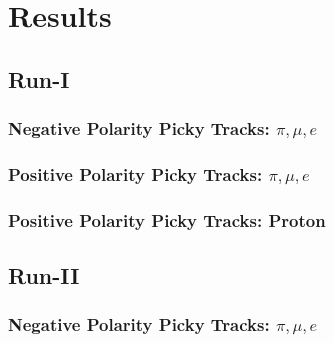 \section{Results}\label{sec:Results}


\subsection{Run-I}\label{sec:RunI}




\subsubsection{Negative Polarity Picky Tracks: $\pi, \mu, e$}\label{sec:Run1NegPickyTrkPiMuE}

\subsubsection{Positive Polarity Picky Tracks: $\pi, \mu, e$}\label{sec:Run1PosPickyTrkPiMuE}

\subsubsection{Positive Polarity Picky Tracks: Proton}\label{sec:Run1PosPickyTrkPiMuE}


\subsection{Run-II}\label{sec:RunII}




\subsubsection{Negative Polarity Picky Tracks: $\pi, \mu, e$}\label{sec:Run2NegPickyTrkPiMuE}

